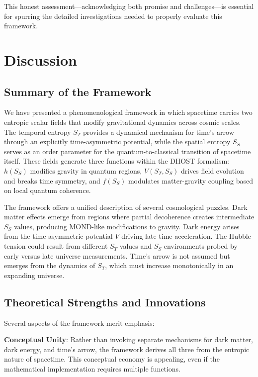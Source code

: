 \documentclass[12pt]{article}
\begin{document}
This honest assessment---acknowledging both promise and challenges---is essential for spurring the detailed investigations needed to properly evaluate this framework.

\section{Discussion}

\subsection{Summary of the Framework}

We have presented a phenomenological framework in which spacetime carries two entropic scalar fields that modify gravitational dynamics across cosmic scales. The temporal entropy $S_T$ provides a dynamical mechanism for time's arrow through an explicitly time-asymmetric potential, while the spatial entropy $S_S$ serves as an order parameter for the quantum-to-classical transition of spacetime itself. These fields generate three functions within the DHOST formalism: $h(S_S)$ modifies gravity in quantum regions, $V(S_T, S_S)$ drives field evolution and breaks time symmetry, and $f(S_S)$ modulates matter-gravity coupling based on local quantum coherence.

The framework offers a unified description of several cosmological puzzles. Dark matter effects emerge from regions where partial decoherence creates intermediate $S_S$ values, producing MOND-like modifications to gravity. Dark energy arises from the time-asymmetric potential $V$ driving late-time acceleration. The Hubble tension could result from different $S_T$ values and $S_S$ environments probed by early versus late universe measurements. Time's arrow is not assumed but emerges from the dynamics of $S_T$, which must increase monotonically in an expanding universe.

\subsection{Theoretical Strengths and Innovations}

Several aspects of the framework merit emphasis:

\textbf{Conceptual Unity}: Rather than invoking separate mechanisms for dark matter, dark energy, and time's arrow, the framework derives all three from the entropic nature of spacetime. This conceptual economy is appealing, even if the mathematical implementation requires multiple functions.
\end{document}
